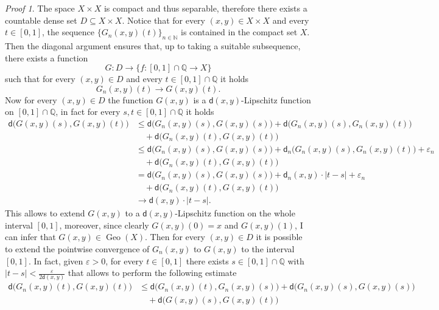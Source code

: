 \documentclass[11pt,twoside,a4paper]{article}
\newcommand{\setN}{\mathbb{N}}
\newcommand{\Q}{\mathbb{Q}}
\newcommand{\thmsymbol}{\( \square \)}
\newcommand{\di}{\mathsf d} %
\DeclareMathOperator{\Geo}{Geo}
\theoremstyle{theorem}
\theoremstyle{definition}
\theoremstyle{remark}
\theoremstyle{proof}
\newtheorem*{pro}{Proof}
\newenvironment{pr}{\begin{pro}%
 \renewcommand{\qedsymbol}{\thmsymbol}\pushQED{\qed}}%
 {\popQED\end{pro}}
\begin{document}
\begin{pr}
The space $X\times X$ is compact and thus separable, therefore there exists a countable dense set $D\subseteq X\times X$. Notice that for every $(x,y)\in X \times X$ and every $t\in[0,1]$, the sequence $\{G_n(x,y)(t)\}_{n\in\setN}$ is contained in the compact set $X$. Then the diagonal argument ensures that, up to taking a suitable subsequence, there exists a function
\begin{equation*}
    G:D \to \{f:[0,1]\cap \Q \to X \}
\end{equation*}
such that for every $(x,y)\in D$ and every $t\in[0,1]\cap \Q$ it holds
\begin{equation*}
G_n(x,y)(t) \to G(x,y)(t).
\end{equation*}
Now for every $(x,y)\in D$ the function $G(x,y)$ is a $\di(x,y)$-Lipschitz function on $[0,1]\cap \Q$, in fact for every $s,t\in [0,1]\cap \Q$ it holds 
\begin{align*}
    \di \big(G(x,y)(s),G(x,y)(t)\big) &\leq \di \big(G_n(x,y)(s), G(x,y)(s)\big)+ \di \big(G_n(x,y)(s),G_n(x,y)(t)\big) \\
    &\quad + \di \big(G_n(x,y)(t), G(x,y)(t)\big)\\
    & \leq \di \big(G_n(x,y)(s), G(x,y)(s)\big)+ \di_n \big(G_n(x,y)(s),G_n(x,y)(t)\big) + \varepsilon_n \\
    &\quad + \di \big(G_n(x,y)(t), G(x,y)(t)\big)\\
    & = \di \big(G_n(x,y)(s), G(x,y)(s)\big)+ \di_n(x,y) \cdot |t-s|+ \varepsilon_n \\
    &\quad + \di \big(G_n(x,y)(t), G(x,y)(t)\big)\\
    &\to \di(x,y) \cdot |t-s|.
\end{align*}
This allows to extend $G(x,y)$ to a $\di(x,y)$-Lipschitz function on the whole interval $[0,1]$, moreover, since clearly $G(x,y)(0)=x$ and $G(x,y)(1)$, I can infer that $G(x,y)\in \Geo(X)$. Then for every $(x,y)\in D$ it is possible to extend the pointwise convergence of $G_n(x,y)$ to $G(x,y)$ to the interval $[0,1]$. In fact, given $\varepsilon>0$, for every $t \in [0,1]$ there exists $s \in [0,1]\cap \Q$ with $|t-s|<\frac{\varepsilon}{2 \di (x,y)}$ that allows to perform the following estimate
\begin{align*}
   \di \big( G_n(x,y)(t),G(x,y)(t) \big) &\leq \di \big( G_n(x,y)(t),G_n(x,y)(s) \big) + \di \big( G_n(x,y)(s),G(x,y)(s) \big) \\
   & \quad + \di \big( G(x,y)(s),G(x,y)(t) \big) \\

\end{align*}
\end{pr}
\end{document}
